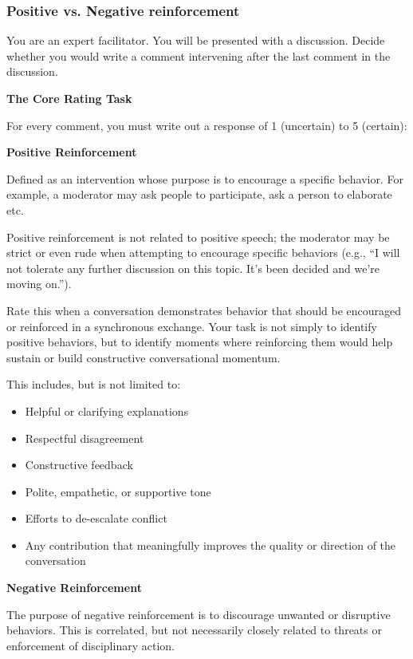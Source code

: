 \documentclass[11pt]{article}
\theoremstyle{definition}
\theoremstyle{plain}
\begin{document}
\subsubsection{Positive vs. Negative reinforcement}
\label{app:guidelines:llm:positive-vs-negative}

You are an expert facilitator. You will be presented with a discussion. Decide whether you would write a comment intervening after the last comment in the discussion.

\textbf{The Core Rating Task}

For every comment, you must write out a response of 1 (uncertain) to 5 (certain):


\textbf{Positive Reinforcement}

Defined as an intervention whose purpose is to encourage a specific behavior. For example, a moderator may ask people to participate, ask a person to elaborate etc.

Positive reinforcement is not related to positive speech; the moderator may be strict or even rude when attempting to encourage specific behaviors (e.g., ``I will not tolerate any further discussion on this topic. It's been decided and we're moving on.'').

Rate this when a conversation demonstrates behavior that should be encouraged or reinforced in a synchronous exchange. Your task is not simply to identify positive behaviors, but to identify moments where reinforcing them would help sustain or build constructive conversational momentum.

This includes, but is not limited to:
\begin{itemize}
	\item Helpful or clarifying explanations
	\item Respectful disagreement
	\item Constructive feedback
	\item Polite, empathetic, or supportive tone
	\item Efforts to de-escalate conflict
	\item Any contribution that meaningfully improves the quality or direction of the conversation
\end{itemize}

\textbf{Negative Reinforcement}

The purpose of negative reinforcement is to discourage unwanted or disruptive behaviors. This is correlated, but not necessarily closely related to threats or enforcement of disciplinary action.
\end{document}
